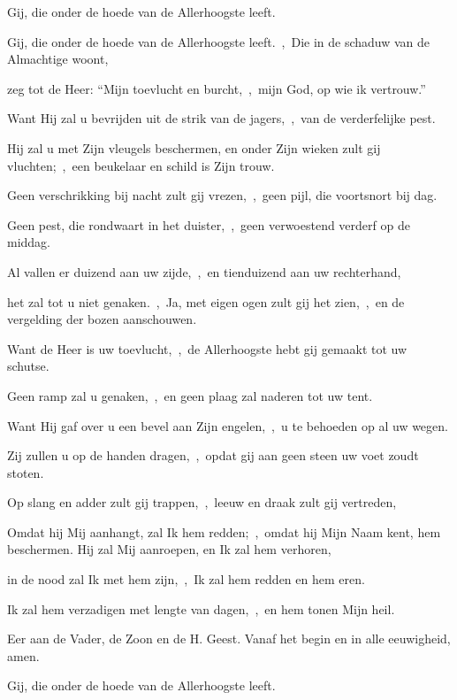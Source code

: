 \documentclass[12pt,twoside,a5paper]{article}
\begin{document}
\begin{halfparskip}
   Gij, die onder de hoede van de Allerhoogste leeft.


  Gij, die onder de hoede van de Allerhoogste leeft.~\sep\ Die in de schaduw van de Almachtige woont,

  zeg tot de Heer: ``Mijn toevlucht en burcht,~\sep\ mijn God, op wie ik vertrouw.''

  Want Hij zal u bevrijden uit de strik van de jagers,~\sep\ van de verderfelijke pest.

  Hij zal u met Zijn vleugels beschermen, en onder Zijn wieken zult gij vluchten;~\sep\ een beukelaar en schild is Zijn trouw.

  Geen verschrikking bij nacht zult gij vrezen,~\sep\ geen pijl, die voortsnort bij dag.

  Geen pest, die rondwaart in het duister,~\sep\ geen verwoestend verderf op de middag.

  Al vallen er duizend aan uw zijde,~\sep\ en tienduizend aan uw rechterhand,

  het zal tot u niet genaken.~\sep\ Ja, met eigen ogen zult gij het zien,~\sep\ en de vergelding der bozen aanschouwen.

  Want de Heer is uw toevlucht,~\sep\ de Allerhoogste hebt gij gemaakt tot uw schutse.

  Geen ramp zal u genaken,~\sep\ en geen plaag zal naderen tot uw tent.

  Want Hij gaf over u een bevel aan Zijn engelen,~\sep\ u te behoeden op al uw wegen.

  Zij zullen u op de handen dragen,~\sep\ opdat gij aan geen steen uw voet zoudt stoten.

  Op slang en adder zult gij trappen,~\sep\ leeuw en draak zult gij vertreden,

  Omdat hij Mij aanhangt, zal Ik hem redden;~\sep\ omdat hij Mijn Naam kent, hem beschermen. Hij zal Mij aanroepen, en Ik zal hem verhoren,

  in de nood zal Ik met hem zijn,~\sep\ Ik zal hem redden en hem eren.

  Ik zal hem verzadigen met lengte van dagen,~\sep\ en hem tonen Mijn heil.

  Eer aan de Vader, de Zoon en de H. Geest. Vanaf het begin en in alle eeuwigheid, amen.

   Gij, die onder de hoede van de Allerhoogste leeft.

\end{halfparskip}
\end{document}
